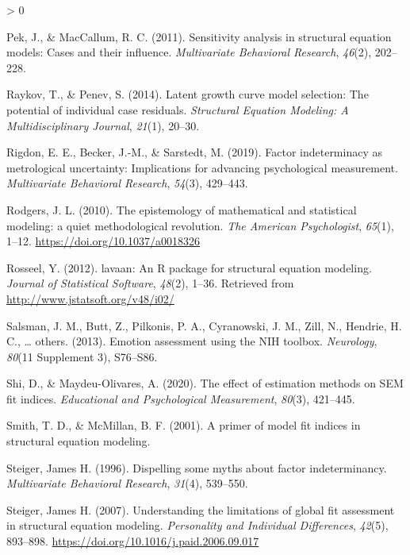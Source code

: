 \documentclass[
  english,
  man]{apa6}
\newlength{\cslhangindent}
\newenvironment{CSLReferences}[2] %
 {%
  \setlength{\parindent}{0pt}
  \ifodd #1 \everypar{\setlength{\hangindent}{\cslhangindent}}\ignorespaces\fi
  \ifnum #2 > 0
  \setlength{\parskip}{#2\baselineskip}
  \fi
 }%
 {}
\begin{document}
\begin{CSLReferences}{1}{0}
\leavevmode\hypertarget{ref-pek2011sensitivity}{}%
Pek, J., \& MacCallum, R. C. (2011). Sensitivity analysis in structural equation models: Cases and their influence. \emph{Multivariate Behavioral Research}, \emph{46}(2), 202--228.

\leavevmode\hypertarget{ref-raykov2014latent}{}%
Raykov, T., \& Penev, S. (2014). Latent growth curve model selection: The potential of individual case residuals. \emph{Structural Equation Modeling: A Multidisciplinary Journal}, \emph{21}(1), 20--30.

\leavevmode\hypertarget{ref-rigdon2019factor}{}%
Rigdon, E. E., Becker, J.-M., \& Sarstedt, M. (2019). Factor indeterminacy as metrological uncertainty: Implications for advancing psychological measurement. \emph{Multivariate Behavioral Research}, \emph{54}(3), 429--443.

\leavevmode\hypertarget{ref-rodgers_epistemology_2010}{}%
Rodgers, J. L. (2010). {The epistemology of mathematical and statistical modeling: a quiet methodological revolution}. \emph{The American Psychologist}, \emph{65}(1), 1--12. \url{https://doi.org/10.1037/a0018326}

\leavevmode\hypertarget{ref-lavaan}{}%
Rosseel, Y. (2012). {lavaan}: An {R} package for structural equation modeling. \emph{Journal of Statistical Software}, \emph{48}(2), 1--36. Retrieved from \url{http://www.jstatsoft.org/v48/i02/}

\leavevmode\hypertarget{ref-salsman2013emotion}{}%
Salsman, J. M., Butt, Z., Pilkonis, P. A., Cyranowski, J. M., Zill, N., Hendrie, H. C., \ldots{} others. (2013). Emotion assessment using the {NIH} toolbox. \emph{Neurology}, \emph{80}(11 Supplement 3), S76--S86.

\leavevmode\hypertarget{ref-shi2020effect}{}%
Shi, D., \& Maydeu-Olivares, A. (2020). The effect of estimation methods on {SEM} fit indices. \emph{Educational and Psychological Measurement}, \emph{80}(3), 421--445.

\leavevmode\hypertarget{ref-smith2001primer}{}%
Smith, T. D., \& McMillan, B. F. (2001). A primer of model fit indices in structural equation modeling.

\leavevmode\hypertarget{ref-steiger1996dispelling}{}%
Steiger, James H. (1996). Dispelling some myths about factor indeterminancy. \emph{Multivariate Behavioral Research}, \emph{31}(4), 539--550.

\leavevmode\hypertarget{ref-Steiger2007}{}%
Steiger, James H. (2007). {Understanding the limitations of global fit assessment in structural equation modeling}. \emph{Personality and Individual Differences}, \emph{42}(5), 893--898. \url{https://doi.org/10.1016/j.paid.2006.09.017}


\end{CSLReferences}
\end{document}
